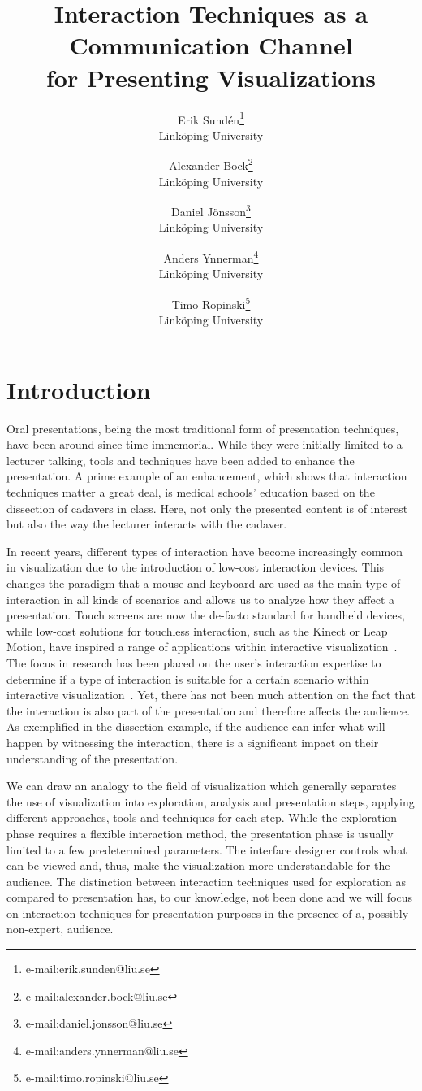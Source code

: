\documentclass[review,journal]{vgtc}         %
\title{Interaction Techniques as a Communication Channel\\for Presenting Visualizations} %
\author{Erik Sund\'en\thanks{e-mail:erik.sunden@liu.se}\\ %
        \scriptsize Link{\"o}ping University %
\and Alexander Bock\thanks{e-mail:alexander.bock@liu.se}\\ %
			   \scriptsize Link{\"o}ping University %
\and Daniel J\"onsson\thanks{e-mail:daniel.jonsson@liu.se}\\ %
          \scriptsize Link{\"o}ping University %
\and Anders Ynnerman\thanks{e-mail:anders.ynnerman@liu.se}\\ %
          \scriptsize Link{\"o}ping University %
\and Timo Ropinski\thanks{e-mail:timo.ropinski@liu.se}\\ %
           \scriptsize Link{\"o}ping University }
\begin{document}
\maketitle

\section{Introduction}\label{sec:introduction}
Oral presentations, being the most traditional form of presentation techniques, have been around since time immemorial.
While they were initially limited to a lecturer talking, tools and techniques have been added to enhance the presentation.
A prime example of an enhancement, which shows that interaction techniques matter a great deal, is medical schools' education based on the dissection of cadavers in class.
Here, not only the presented content is of interest but also the way the lecturer interacts with the cadaver.

In recent years, different types of interaction have become increasingly common in visualization due to the introduction of low-cost interaction devices.
This changes the paradigm that a mouse and keyboard are used as the main type of interaction in all kinds of scenarios and allows us to analyze how they affect a presentation.
Touch screens are now the de-facto standard for handheld devices, while low-cost solutions for touchless interaction, such as the Kinect or Leap Motion, have inspired a range of applications within interactive visualization~\cite{zora82163, Jalaliniya:2013:TIM:2494091.2497332, OHaraGSPVMCCRDC14, 0724-4983}.
The focus in research has been placed on the user's interaction expertise to determine if a type of interaction is suitable for a certain scenario within interactive visualization~\cite{5693835, so64840, DBLP:journals/tvcg/YiKSJ07}.
Yet, there has not been much attention on the fact that the interaction is also part of the presentation and therefore affects the audience.
As exemplified in the dissection example, if the audience can infer what will happen by witnessing the interaction, there is a significant impact on their understanding of the presentation.

We can draw an analogy to the field of visualization which generally separates the use of visualization into exploration, analysis and presentation steps, applying different approaches, tools and techniques for each step.
While the exploration phase requires a flexible interaction method, the presentation phase is usually limited to a few predetermined parameters.
The interface designer controls what can be viewed and, thus, make the visualization more understandable for the audience.
The distinction between interaction techniques used for exploration as compared to presentation has, to our knowledge, not been done and we will focus on interaction techniques for presentation purposes in the presence of a, possibly non-expert, audience.
\end{document}
